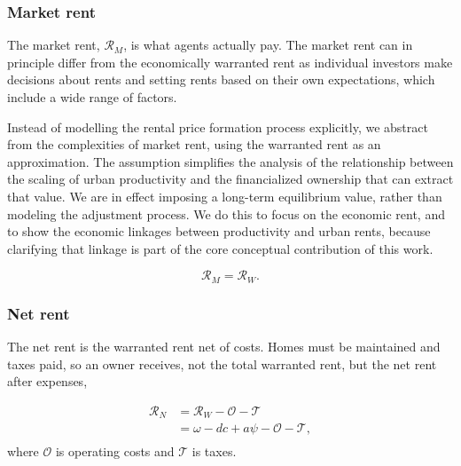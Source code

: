  
\subsubsection{Market rent} \label{section-market-rent}
The \gls{market rent}, $\mathcal{R}_M$, is what agents actually pay. The market rent can in principle differ from the economically warranted rent as individual investors make decisions about rents and setting rents based on their own expectations, which include a wide range of factors. 

Instead of modelling the rental price formation process explicitly, we abstract from the complexities  of market rent, using the warranted rent as an approximation. The assumption simplifies the analysis of the relationship between the scaling of urban productivity and the financialized ownership that can extract that value. We are in effect imposing a long-term equilibrium value, rather than modeling the adjustment process. We do this to focus on the economic rent, and to show the economic linkages between productivity and urban rents, because clarifying that linkage is part of the core conceptual contribution of this work. 

\[\mathcal{R}_M = \mathcal{R}_W.\] 


\subsubsection{Net rent} \label{section-net-rent}
The \gls{net rent} is the warranted rent net of costs. Homes must be maintained and taxes paid, so an owner receives, not the total warranted rent, but the net rent after expenses,

\begin{align}
\mathcal{R}_N &= \mathcal{R}_W - \mathcal{O} - \mathcal{T}\\
&= \omega - {dc} + a\psi -  \mathcal{O} - \mathcal{T}, \\
\end{align}
where $\mathcal{O}$ is operating costs and $\mathcal{T}$ is taxes. 




